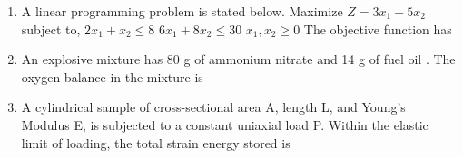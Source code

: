 \documentclass[journal,12pt,onecolumn]{IEEEtran}
\theoremstyle{remark}
\begin{document}
\begin{enumerate}
\item A linear programming problem is stated below.
Maximize $Z=3x_{1}+5x_{2}$
subject to, $2x_{1}+x_{2}\le8$
$6x_{1}+8x_{2}\le30$
$x_1, x_{2}\ge0$
The objective function has

\hfill{}

\begin{enumerate}
\end{enumerate}

\item An explosive mixture has 80 g of ammonium nitrate  and 14 g of fuel oil . The oxygen balance in the mixture is

\hfill{}

\begin{enumerate}
\end{enumerate}

\item A cylindrical sample of cross-sectional area A, length L, and Young's Modulus E, is subjected to a constant uniaxial load P. Within the elastic limit of loading, the total strain energy stored is

\hfill{}

\begin{enumerate}
\end{enumerate}


\end{enumerate}
\end{document}
